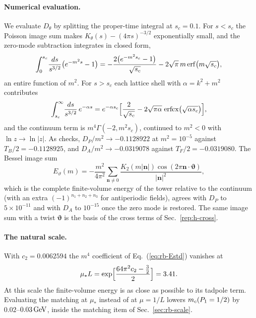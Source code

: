 \paragraph{Numerical evaluation.}
We evaluate $D_\theta$ by splitting the proper-time integral at $s_c=0.1$. %
For $s<s_c$ the Poisson image sum makes $K_\theta(s)-(4\pi s)^{-3/2}$ exponentially small, and the zero-mode subtraction integrates in closed form,
\begin{equation}
\int_0^{s_c}\!\frac{ds}{s^{3/2}}\bigl(e^{-m^2s}-1\bigr)=-\frac{2\bigl(e^{-m^2s_c}-1\bigr)}{\sqrt{s_c}}-2\sqrt\pi\,m\,{\rm erf}\bigl(m\sqrt{s_c}\bigr),
\label{eq:rb-small-s}
\end{equation}
an entire function of $m^2$.
For $s>s_c$ each lattice shell with $\alpha=k^2+m^2$ contributes
\begin{equation}
\int_{s_c}^\infty\!\frac{ds}{s^{3/2}}\,e^{-\alpha s}=e^{-\alpha s_c}\Bigl[\frac{2}{\sqrt{s_c}}-2\sqrt{\pi\alpha}\;{\rm erfcx}\bigl(\sqrt{\alpha s_c}\bigr)\Bigr],
\label{eq:rb-shell}
\end{equation}
and the continuum term is $m^4\Gamma(-2,m^2s_c)$, continued to $m^2<0$ with $\ln z\to\ln|z|$.
As checks, $D_P/m^2\to-0.1128922$ at $m^2=10^{-5}$ against $T_B/2=-0.1128925$, and $D_A/m^2\to-0.0319078$ against $T_F/2=-0.0319080$. %
The Bessel image sum
\begin{equation}
E_{\vartheta}(m)=-\frac{m^2}{4\pi^2}\sum_{\bm n\neq0}\frac{K_2(m|\bm n|)\cos(2\pi\bm n\cdot\bm\vartheta)}{|\bm n|^2},
\label{eq:rb-Etheta}
\end{equation}
which is the complete finite-volume energy of the tower relative to the continuum (with an extra $(-1)^{n_1+n_2+n_3}$ for antiperiodic fields), agrees with $D_P$ to $5\times10^{-11}$ and with $D_A$ to $10^{-15}$ once the zero mode is restored. %
The same image sum with a twist $\bm\vartheta$ is the basis of the cross terms of Sec.~\ref{rep:h-cross}.

\paragraph{The natural scale.}
With $c_2=0.0062594$ the $m^4$ coefficient of Eq.~(\ref{eq:rb-Estd}) vanishes at %
\begin{equation}
\mu_*L=\exp\Bigl[\frac{64\pi^2c_2-\frac32}{2}\Bigr]=3.41. %
\label{eq:rb-mustar}
\end{equation}
At this scale the finite-volume energy is as close as possible to its tadpole term.
Evaluating the matching at $\mu_*$ instead of at $\mu=1/L$ lowers $m_c(P_1=1/2)$ by $0.02$--$0.03\,\mathrm{GeV}$, inside the matching item of Sec.~\ref{sec:rb-scale}. %

